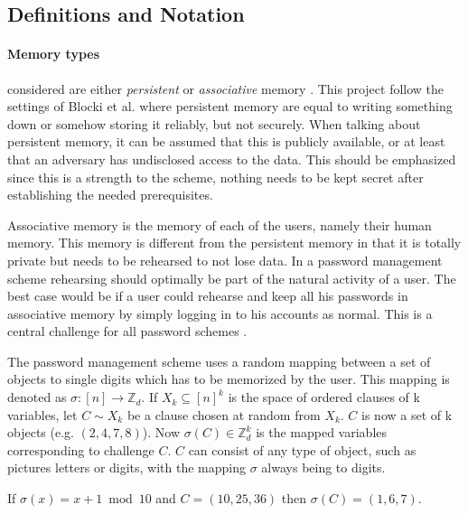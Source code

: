 \subsection{Definitions and Notation}
\paragraph{Memory types} considered are either \emph{persistent} or \emph{associative} memory \cite{human-memory}. This project follow the settings of Blocki et al. \cite{naturally-rehearsing, hcp-blocki} where persistent memory are equal to writing something down or somehow storing it reliably, but not securely. When talking about persistent memory, it can be assumed that this is publicly available, or at least that an adversary has undisclosed access to the data. This should be emphasized since this is a strength to the scheme, nothing needs to be kept secret after establishing the needed prerequisites. 
    \par Associative memory is the memory of each of the users, namely their human memory. This memory is different from the persistent memory in that it is totally private but needs to be rehearsed to not lose data. In a password management scheme rehearsing should optimally be part of the natural activity of a user. The best case would be if a user could rehearse and keep all his passwords in associative memory by simply logging in to his accounts as normal. This is a central challenge for all password schemes \cite{naturally-rehearsing}.

The password management scheme uses a random mapping between a set of objects to single digits which has to be memorized by the user. This mapping is denoted as $\sigma : [n] \rightarrow \mathbb{Z}_d$. If $X_k \subseteq [n]^k$ is the space of ordered clauses of k variables, let $C\sim X_k$ be a clause chosen at random from $X_k$. $C$ is now a set of k objects (e.g. $(2,4,7,8)$). Now $\sigma (C) \in \mathbb{Z}_d^k$ is the mapped variables corresponding to challenge $C$. $C$ can consist of any type of object, such as pictures letters or digits, with the mapping $\sigma$ always being to digits.

\begin{example}
    If $\sigma(x) = x+1  \bmod 10$ and $C = (10,25,36)$ then $\sigma(C) = (1,6,7)$.
\end{example}

